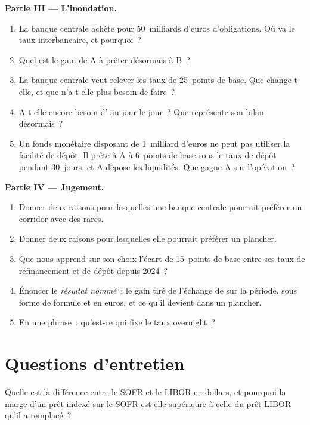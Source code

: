 \begin{problem}
\medskip\noindent\textbf{Partie III --- L'inondation.}
\begin{enumerate}[resume]
\item La banque centrale achète pour 50~milliards d'euros d'obligations. Où
va le taux interbancaire, et pourquoi~?
\item Quel est le gain de A à prêter désormais à B~?
\item La banque centrale veut relever les taux de 25~points de base. Que
change-t-elle, et que n'a-t-elle plus besoin de faire~?
\item A-t-elle encore besoin d' au jour le jour~? Que
représente son bilan désormais~?
\item Un fonds monétaire disposant de 1~milliard d'euros ne peut pas utiliser la
facilité de dépôt. Il prête à A à 6~points de base sous le taux de dépôt pendant
30~jours, et A dépose les liquidités. Que gagne A sur l'opération~?
\end{enumerate}

\medskip\noindent\textbf{Partie IV --- Jugement.}
\begin{enumerate}[resume]
\item Donner deux raisons pour lesquelles une banque centrale pourrait préférer un
corridor avec des  rares.
\item Donner deux raisons pour lesquelles elle pourrait préférer un plancher.
\item Que nous apprend sur son choix l'écart de 15~points de base entre ses taux
de refinancement et de dépôt depuis 2024~?
\item Énoncer le \emph{résultat nommé}~: le gain tiré de l'échange de  sur la
période, sous forme de formule et en euros, et ce qu'il devient dans un plancher.
\item En une phrase~: qu'est-ce qui fixe le taux overnight~?
\end{enumerate}
\end{problem}

\section{Questions d'entretien}

\begin{interviewq}\label{iq:m2:central-banks-and-the-short-rate:1}
Quelle est la différence entre le SOFR et le LIBOR en dollars, et pourquoi
la marge d'un prêt indexé sur le SOFR est-elle supérieure à celle du prêt LIBOR qu'il a remplacé~?
\end{interviewq}

